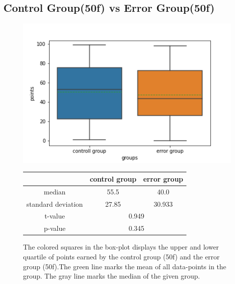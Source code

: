 \documentclass[runningheads]{llncs}
\begin{document}
\subsection{Control Group(50f) vs Error Group(50f)}
\begin{figure}[!ht]
    \begin{minipage}{0.4\textwidth}        
        \includegraphics[width=\textwidth]{code/generate/all.png}
        \caption{The colored squares in the box-plot displays
        the upper and lower quartile of points earned by the control group (50f) and
        the error group (50f).The green line marks the mean of all data-points in the group.
        The gray line marks the median  of the given group.} \label{fig3}
    \end{minipage}
\hfill
\begin{minipage}{0.4\textwidth}
\begin{tabular}[]{| c | c | c |}
        \hline
        & control group & error group \\
        \hline
        median & 55.5&40.0 \\
        \hline
        standard deviation & 27.85&30.933 \\
        \hline
        t-value & \multicolumn{2}{c|}{0.949} \\
        \hline
        p-value & \multicolumn{2}{c|}{0.345} \\
        \hline            
\end{tabular}
\end{minipage}
\end{figure}
\end{document}
